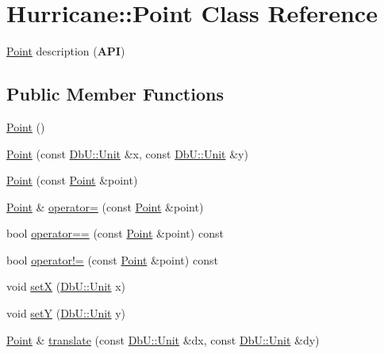 \hypertarget{classHurricane_1_1Point}{}\section{Hurricane\+:\+:Point Class Reference}
\label{classHurricane_1_1Point}


\mbox{\hyperlink{classHurricane_1_1Point}{Point}} description ({\bfseries A\+PI})  


\subsection*{Public Member Functions}
\begin{DoxyCompactItemize}
\item 
\mbox{\hyperlink{classHurricane_1_1Point_a54c8ad2b1f3005ac1564c0fd7d5ef5b7}{Point}} ()
\item 
\mbox{\hyperlink{classHurricane_1_1Point_a871672d833661cc79101d1e43d4d8325}{Point}} (const \mbox{\hyperlink{group__DbUGroup_ga4fbfa3e8c89347af76c9628ea06c4146}{Db\+U\+::\+Unit}} \&x, const \mbox{\hyperlink{group__DbUGroup_ga4fbfa3e8c89347af76c9628ea06c4146}{Db\+U\+::\+Unit}} \&y)
\item 
\mbox{\hyperlink{classHurricane_1_1Point_a8840ca5f42bec6203058911ea0ba6cb9}{Point}} (const \mbox{\hyperlink{classHurricane_1_1Point}{Point}} \&point)
\item 
\mbox{\hyperlink{classHurricane_1_1Point}{Point}} \& \mbox{\hyperlink{classHurricane_1_1Point_ae3e33361927744a483d97cb7d182a1d6}{operator=}} (const \mbox{\hyperlink{classHurricane_1_1Point}{Point}} \&point)
\item 
bool \mbox{\hyperlink{classHurricane_1_1Point_a2aeb5fe96fbe9324dcbc90d41ad70fb9}{operator==}} (const \mbox{\hyperlink{classHurricane_1_1Point}{Point}} \&point) const
\item 
bool \mbox{\hyperlink{classHurricane_1_1Point_ac6a0b7107f04913b78f96afa69e68d86}{operator!=}} (const \mbox{\hyperlink{classHurricane_1_1Point}{Point}} \&point) const
\item 
void \mbox{\hyperlink{classHurricane_1_1Point_adebab98c82f881b1d2e1e7680a907830}{setX}} (\mbox{\hyperlink{group__DbUGroup_ga4fbfa3e8c89347af76c9628ea06c4146}{Db\+U\+::\+Unit}} x)
\item 
void \mbox{\hyperlink{classHurricane_1_1Point_a14a51f177d298ccccb25066c0298a268}{setY}} (\mbox{\hyperlink{group__DbUGroup_ga4fbfa3e8c89347af76c9628ea06c4146}{Db\+U\+::\+Unit}} y)
\item 
\mbox{\hyperlink{classHurricane_1_1Point}{Point}} \& \mbox{\hyperlink{classHurricane_1_1Point_a86d908d60346bc15f1af4e96eddbdb19}{translate}} (const \mbox{\hyperlink{group__DbUGroup_ga4fbfa3e8c89347af76c9628ea06c4146}{Db\+U\+::\+Unit}} \&dx, const \mbox{\hyperlink{group__DbUGroup_ga4fbfa3e8c89347af76c9628ea06c4146}{Db\+U\+::\+Unit}} \&dy)
\end{DoxyCompactItemize}


